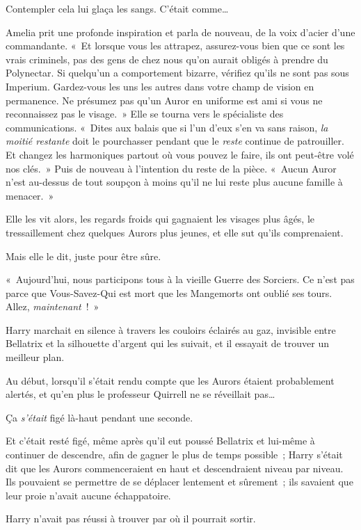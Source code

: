 Contempler cela lui glaça les sangs. C'était comme…

Amelia prit une profonde inspiration et parla de nouveau, de la voix d'acier d'une commandante. «~Et lorsque vous les attrapez, assurez-vous bien que ce sont les vrais criminels, pas des gens de chez nous qu'on aurait obligés à prendre du Polynectar. Si quelqu'un a comportement bizarre, vérifiez qu'ils ne sont pas sous Imperium. Gardez-vous les uns les autres dans votre champ de vision en permanence. Ne présumez pas qu'un Auror en uniforme est ami si vous ne reconnaissez pas le visage.~» Elle se tourna vers le spécialiste des communications. «~Dites aux balais que si l'un d'eux s'en va sans raison, \emph{la moitié restante} doit le pourchasser pendant que le \emph{reste} continue de patrouiller. Et changez les harmoniques partout où vous pouvez le faire, ils ont peut-être volé nos clés.~» Puis de nouveau à l'intention du reste de la pièce. «~Aucun Auror n'est au-dessus de tout soupçon à moins qu'il ne lui reste plus aucune famille à menacer.~»

Elle les vit alors, les regards froids qui gagnaient les visages plus âgés, le tressaillement chez quelques Aurors plus jeunes, et elle sut qu'ils comprenaient.

Mais elle le dit, juste pour être sûre.

«~Aujourd'hui, nous participons tous à la vieille Guerre des Sorciers. Ce n'est pas parce que Vous-Savez-Qui est mort que les Mangemorts ont oublié ses tours. Allez, \emph{maintenant}~!~»

\later

Harry marchait en silence à travers les couloirs éclairés au gaz, invisible entre Bellatrix et la silhouette d'argent qui les suivait, et il essayait de trouver un meilleur plan.

Au début, lorsqu'il s'était rendu compte que les Aurors étaient probablement alertés, et qu'en plus le professeur Quirrell ne se réveillait pas…

Ça \emph{s'était} figé là-haut pendant une seconde.

Et c'était resté figé, même après qu'il eut poussé Bellatrix et lui-même à continuer de descendre, afin de gagner le plus de temps possible~; Harry s'était dit que les Aurors commenceraient en haut et descendraient niveau par niveau. Ils pouvaient se permettre de se déplacer lentement et sûrement~; ils savaient que leur proie n'avait aucune échappatoire.

Harry n'avait pas réussi à trouver par où il pourrait sortir.


